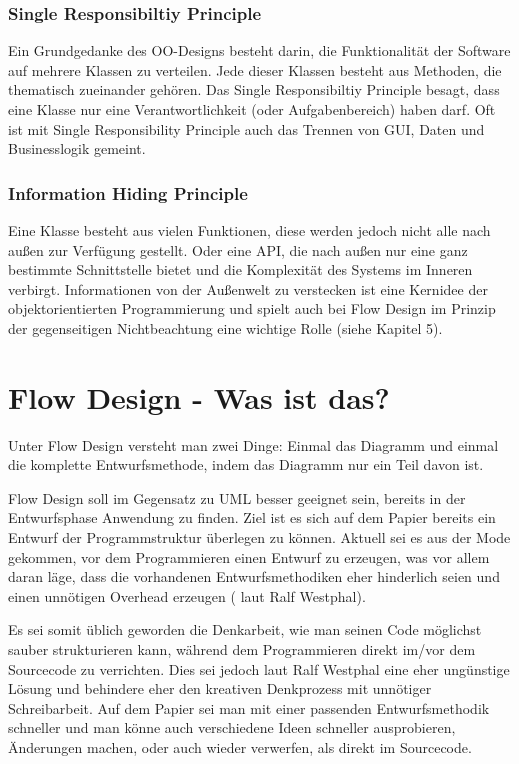 \subsubsection{Single Responsibiltiy Principle}

Ein Grundgedanke des OO-Designs besteht darin, die Funktionalität der Software auf mehrere
Klassen zu verteilen. Jede dieser Klassen besteht aus Methoden, die thematisch zueinander gehören. 
Das Single Responsibiltiy Principle besagt, dass eine Klasse nur eine
Verantwortlichkeit (oder Aufgabenbereich) haben darf.
Oft ist mit Single Responsibility Principle auch das Trennen von
GUI, Daten und Businesslogik gemeint.

\subsubsection{Information Hiding Principle}

Eine Klasse besteht aus vielen Funktionen, diese werden jedoch nicht alle nach
außen zur Verfügung gestellt.
Oder eine API, die nach außen nur eine ganz bestimmte Schnittstelle bietet und
die Komplexität des Systems im Inneren verbirgt. Informationen von der
Außenwelt zu verstecken ist eine Kernidee der objektorientierten Programmierung
und spielt auch bei Flow Design im Prinzip der gegenseitigen Nichtbeachtung
eine wichtige Rolle (siehe Kapitel 5).



\section{Flow Design - Was ist das?}

Unter Flow Design versteht man zwei Dinge:
Einmal das Diagramm und einmal die komplette Entwurfsmethode, indem das
Diagramm nur ein Teil davon ist.

Flow Design soll im Gegensatz zu UML besser geeignet sein, bereits in der Entwurfsphase Anwendung zu finden.
Ziel ist es sich auf dem Papier bereits ein Entwurf der Programmstruktur überlegen zu können.
Aktuell sei es aus der Mode gekommen, vor dem Programmieren einen Entwurf zu erzeugen, was vor allem daran läge, dass die vorhandenen
Entwurfsmethodiken eher hinderlich seien und einen unnötigen Overhead erzeugen ( laut Ralf Westphal).

Es sei somit üblich geworden die Denkarbeit, wie man seinen Code möglichst sauber strukturieren kann,
während dem Programmieren direkt im/vor dem Sourcecode zu verrichten.
Dies sei jedoch laut Ralf Westphal eine eher ungünstige Lösung und behindere eher den kreativen Denkprozess mit
unnötiger Schreibarbeit.
Auf dem Papier sei man mit einer passenden Entwurfsmethodik schneller und man könne auch verschiedene Ideen schneller
ausprobieren, Änderungen machen, oder auch wieder verwerfen, als direkt im Sourcecode.

